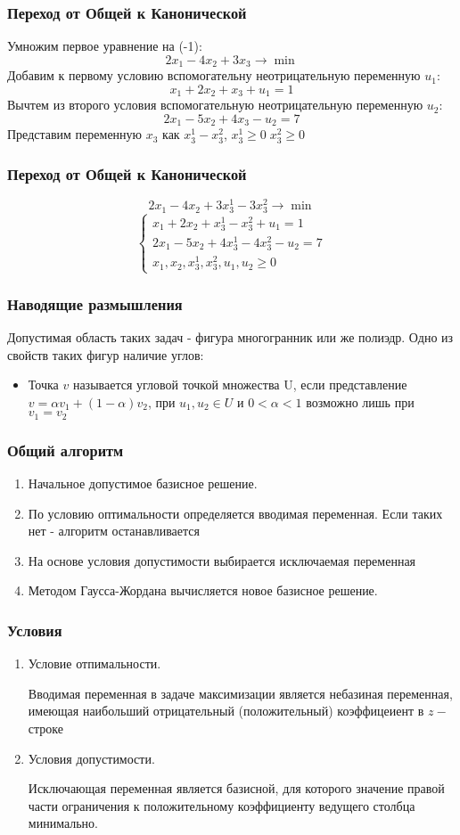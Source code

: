 \documentclass[12pt]{beamer}
\begin{document}
\begin{frame}
\frametitle{Переход от Общей к Канонической}

Умножим первое уравнение на (-1):
\[2x_1-4x_2+3x_3 \to \min\]
Добавим к первому условию вспомогательну неотрицательную переменную $u_1$:
\[x_1+2x_2+x_3+u_1= 1\]
Вычтем из второго условия вспомогательную неотрицательную переменную $u_2$:
\[2x_1-5x_2+4x_3-u_2= 7\]
Представим переменную $x_3$ как $x_3^1-x_3^2$, $x_3^1\geq 0 \;x_3^2\geq 0$
\end{frame}
\begin{frame}
	\frametitle{Переход от Общей к Канонической}
\[2x_1-4x_2+3x_3^1-3x_3^2 \to \min\]
\begin{equation*}
	\begin{cases}	
		x_1+2x_2+x_3^1-x_3^2+u_1= 1\\
		2x_1-5x_2+4x_3^1-4x_3^2-u_2= 7\\
		x_1,x_2,x_3^1,x_3^2,u_1,u_2\geq0
	\end{cases}
\end{equation*}
\end{frame}

\begin{frame}
	\frametitle{Наводящие размышления}
	Допустимая область таких задач - фигура многогранник или же полиэдр. Одно из свойств таких фигур наличие углов:
	\begin{itemize}
		\item Точка $v$ называется угловой точкой множества U, если представление $v=\alpha v_1+(1-\alpha)v_2$, при $u_1, u_2\in U$ и $0<\alpha <1$ возможно лишь при $v_1=v_2$
	\end{itemize}
\end{frame}

\begin{frame}
	\frametitle{Общий алгоритм}
\begin{enumerate}
	\item Начальное допустимое базисное решение.
	\item По условию оптимальности определяется вводимая переменная. Если таких нет - алгоритм останавливается
	\item На основе условия допустимости выбирается исключаемая переменная
	\item Методом Гаусса-Жордана вычисляется новое базисное решение.
\end{enumerate}
\end{frame}
\begin{frame}
	\frametitle{Условия }
	\begin{enumerate}
		\item Условие отпимальности. 
		
		Вводимая переменная в задаче максимизации является небазиная переменная, имеющая наибольший отрицательный (положительный) коэффицеиент в $z-$ строке
		\item Условия допустимости.
		
		Исключающая переменная является базисной, для которого значение правой части ограничения к положительному коэффициенту ведущего столбца минимально.
	\end{enumerate}
\end{frame}
\end{document}

